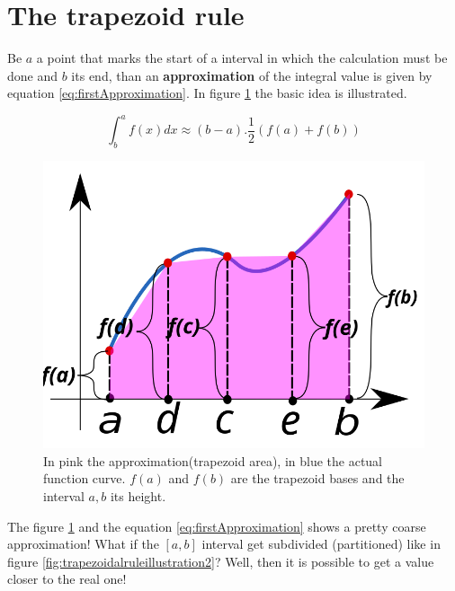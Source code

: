 	\section{The trapezoid rule}
	\par Be $a$ a point that marks the start of a interval in which the calculation must be done and $b$ its end, than an \textbf{approximation} of the integral value is given by equation \ref{eq:firstApproximation}. In figure \ref{fig:trapezoidalruleillustration} the basic idea is illustrated.\newline
	
	\begin{equation}
		\int^a_b{f(x) dx} \approx (b-a).\dfrac{1}{2}(f(a)+f(b))
		\label{eq:firstApproximation}
	\end{equation}

	\begin{figure}[h]
		\centering
		\includegraphics[width=0.7\linewidth]{images/Trapezoidal_rule_illustration}
		\caption[Approximation of an integral]{In pink the approximation(trapezoid area), in blue the actual function curve. $f(a)$ and $f(b)$ are the trapezoid bases and the interval $a, b$ its height. }
		\label{fig:trapezoidalruleillustration}
	\end{figure}
	
	\par The figure \ref{fig:trapezoidalruleillustration} and the equation \ref{eq:firstApproximation} shows a pretty coarse approximation! What if the $[a, b]$ interval get subdivided (partitioned) like in figure \ref{fig:trapezoidalruleillustration2}? Well, then it is possible to get a value closer to the real one!\newline
	

